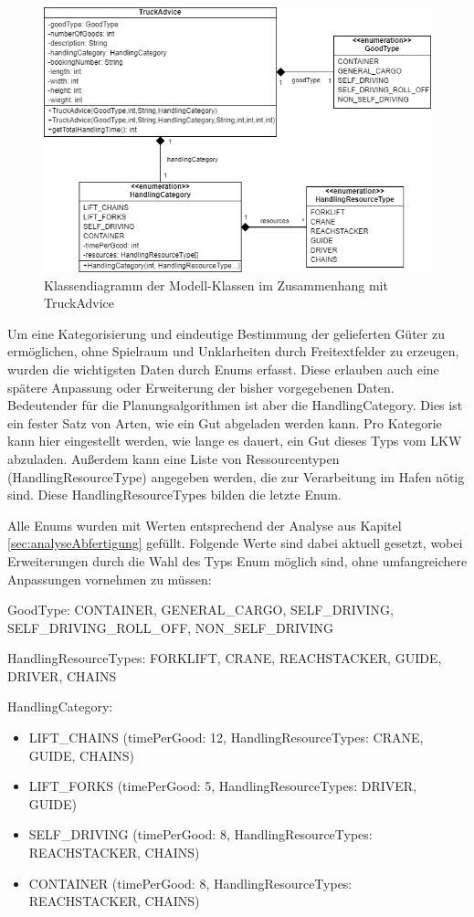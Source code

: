 \begin{figure}[H]
    \centering
    \includegraphics[width=\textwidth]{images/classDiagrams/TruckAdvice_ClassDiagram.png}
    \caption{Klassendiagramm der Modell-Klassen im Zusammenhang mit TruckAdvice}
    \label{fig:classDiagramTruckAdvice}
\end{figure}

Um eine Kategorisierung und eindeutige Bestimmung der gelieferten Güter zu ermöglichen, ohne Spielraum und Unklarheiten durch Freitextfelder zu erzeugen, wurden die wichtigsten Daten durch Enums erfasst. Diese erlauben auch eine spätere Anpassung oder Erweiterung der bisher vorgegebenen Daten. Bedeutender für die Planungsalgorithmen ist aber die HandlingCategory. Dies ist ein fester Satz von Arten, wie ein Gut abgeladen werden kann. Pro Kategorie kann hier eingestellt werden, wie lange es dauert, ein Gut dieses Typs vom LKW abzuladen. Außerdem kann eine Liste von Ressourcentypen (HandlingResourceType) angegeben werden, die zur Verarbeitung im Hafen nötig sind. Diese HandlingResourceTypes bilden die letzte Enum.

Alle Enums wurden mit Werten entsprechend der Analyse aus Kapitel \ref{sec:analyseAbfertigung} gefüllt. Folgende Werte sind dabei aktuell gesetzt, wobei Erweiterungen durch die Wahl des Typs Enum möglich sind, ohne umfangreichere Anpassungen vornehmen zu müssen: 

GoodType: CONTAINER, GENERAL\_CARGO, SELF\_DRIVING, SELF\_DRIVING\_ROLL\_OFF, NON\_SELF\_DRIVING

HandlingResourceTypes: FORKLIFT, CRANE, REACHSTACKER, GUIDE, DRIVER, CHAINS

HandlingCategory: 
\begin{itemize}
    \item LIFT\_CHAINS (timePerGood: 12, HandlingResourceTypes: CRANE, GUIDE, CHAINS)
    \item LIFT\_FORKS (timePerGood: 5, HandlingResourceTypes: DRIVER, GUIDE)
    \item SELF\_DRIVING (timePerGood: 8, HandlingResourceTypes: REACHSTACKER, CHAINS)
    \item CONTAINER (timePerGood: 8, HandlingResourceTypes: REACHSTACKER, CHAINS)
\end{itemize}



